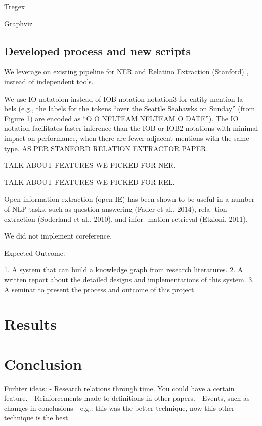 \documentclass[11pt,a4paper,openright]{memoir}
\begin{document}
Tregex

Graphviz

\section{Developed process and new scripts}

We leverage on existing pipeline for NER and Relatino Extraction (Stanford) , instead of independent tools.

We use IO notatoion instead of IOB notation  notation3 for entity mention la- bels (e.g., the labels for the tokens “over the Seattle Seahawks on Sunday” (from Figure 1) are encoded as “O O NFLTEAM NFLTEAM O DATE”). The IO notation facilitates faster inference than the IOB or IOB2 notations with minimal impact on performance, when there are fewer adjacent mentions with the same type. AS PER STANFORD RELATION EXTRACTOR PAPER.

TALK ABOUT FEATURES WE PICKED FOR NER.

TALK ABOUT FEATURES WE PICKED FOR REL.

Open information extraction (open IE) has been shown to be useful in a number of NLP tasks, such as question answering (Fader et al., 2014), rela- tion extraction (Soderland et al., 2010), and infor- mation retrieval (Etzioni, 2011).

We did not implement coreference.

Expected Outcome:

1. A system that can build a knowledge graph from research literatures.  
2. A written report about the detailed designs and implementations of this system.
3. A seminar to present the process and outcome of this project.

\chapter{Results}

\chapter{Conclusion}

Furhter ideas:
- Research relations through time. You could have a certain feature.
- Reinforcements made to definitions in other papers.
- Events, such as changes in conclusions - e.g.: this was the better technique, now this other technique is the best.

\backmatter

\printbibliography

\appendix
\end{document}
